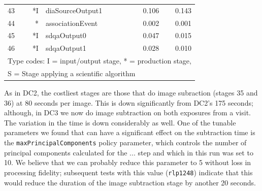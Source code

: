\begin{table}[htbp]
\begin{center}
\begin{tabular}{lrlrr}
43 & *I &              diaSourceOutput1 &  0.106 &  0.143 \\
44 & *\phantom{I}  &              associationEvent &  0.002 &  0.001 \\
45 & *I &                   sdqaOutput0 &  0.047 &  0.015 \\
46 & *I &                   sdqaOutput1 &  0.028 &  0.010 \\
\hline
\multicolumn{5}{l}{Type codes: I = input/output stage, * = production stage,} \\
\multicolumn{5}{l}{S = Stage applying a scientific algorithm} \\
\end{tabular}
\end{center}
\end{table}

As in DC2, the costliest stages are those that do image subraction
(stages 35 and 36) at 80 seconds per image.  This is down
significantly from DC2's 175 seconds; although, in DC3 we now do image
subtraction on both exposures from a visit.  The variation in the time
is down considerably as well.  One of the tunable parameters we found
that can have a significant effect on the subtraction time is the 
{\tt maxPrincipalComponents} policy parameter, which controls the number
of principal components calculated for the ... step and which in this
run was set to 10.  We believe that we can probably reduce this
parameter to 5 without loss in processing fidelity; subsequent tests
with this value ({\tt rlp1248}) indicate that this would reduce the
duration of the image subtraction stage by another 20 seconds.

